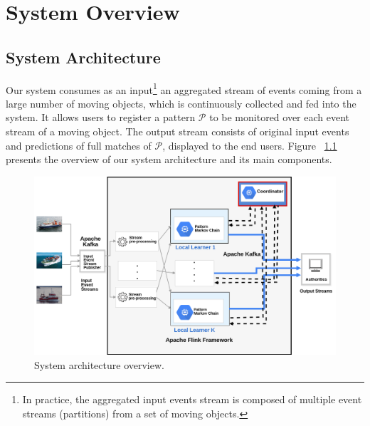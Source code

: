 

\chapter{System Overview}


\section{System Architecture}
\label{sec:architecture}
Our system consumes as an input\footnote{In practice, the aggregated input events stream is composed of multiple event streams (partitions) from a set of moving objects.} an aggregated stream of events coming from a large number of moving objects, which is continuously collected and fed into the system. It allows users to register a pattern $\mathcal{P}$ to be monitored over each event stream of a moving object. The output stream consists of original input events and predictions of full matches of $\mathcal{P}$, displayed to the end users. Figure ~\ref{fig:architecture} presents the overview of our system architecture and its main components.      


\begin{figure}[h]
	
	\includegraphics[width=\linewidth]{chapters/figures/distributed_architecture_f.png}
	
	\caption{System architecture overview.}
	\label{fig:architecture}
\end{figure}


